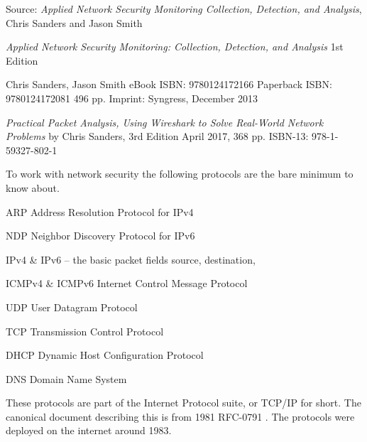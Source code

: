 \documentclass[Screen16to9,17pt]{foils}
\begin{document}
Source: \emph{Applied Network Security Monitoring Collection, Detection, and Analysis},\\
Chris Sanders and Jason Smith



\emph{Applied Network Security Monitoring: Collection, Detection, and Analysis}
1st Edition

Chris Sanders, Jason Smith
eBook ISBN: 9780124172166
Paperback ISBN: 9780124172081 496 pp.
Imprint: Syngress, December 2013



\emph{Practical Packet Analysis,
Using Wireshark to Solve Real-World Network Problems}
by Chris Sanders, 3rd Edition
April 2017, 368 pp.
ISBN-13:
978-1-59327-802-1




To work with network security the following protocols are the bare minimum to know about.

\begin{list2}
\item ARP Address Resolution Protocol for IPv4
\item NDP Neighbor Discovery Protocol for IPv6
\item IPv4 \& IPv6 -- the basic packet fields source, destination,
\item ICMPv4 \& ICMPv6 Internet Control Message Protocol
\item UDP User Datagram Protocol
\item TCP Transmission Control Protocol
\item DHCP Dynamic Host Configuration Protocol
\item DNS Domain Name System
\end{list2}

These protocols are part of the Internet Protocol suite, or TCP/IP for short. The canonical document describing this is from 1981 RFC-0791 . The protocols were deployed on the internet around 1983.






\end{document}
